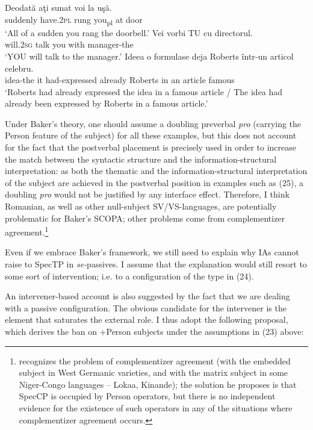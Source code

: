 \documentclass[output=paper]{langsci/langscibook}
\begin{document}
\ea%
    \label{ex:giurgea:25}
    \ea
    \gll Deodată   aţi           sunat   voi     la  uşă.  \\
          suddenly have.2\textsc{pl}  rung   you\textsubscript{pl}   at door\\
    \glt ‘All of a sudden you rang the doorbell.’
    \ex
    \gll Vei        vorbi TU  cu    directorul.         \\
         will.\textsc{2sg} talk    you with manager-the\\
    \glt ‘YOU will talk to the manager.’
    \ex
    \gll Ideea    o formulase         deja      Roberts într-un articol celebru. \\
         idea-the it had-expressed already Roberts  in  an article  famous    \\
    \glt ‘Roberts had already expressed the idea in a famous article / The idea had already been expressed by Roberts in a famous article.’
    \z
\z       

Under Baker’s theory, one should assume a doubling preverbal \textit{pro} (carrying the Person feature of the subject) for all these examples, but this does not account for the fact that the postverbal placement is precisely used in order to increase the match between the syntactic structure and the information-structural interpretation: as both the thematic and the information-structural interpretation of the subject are achieved in the postverbal position in examples such as (25), a doubling \textit{pro} would not be justified by any interface effect. Therefore, I think Romanian, as well as other null-subject SV/VS-languages, are potentially problematic for Baker’s SCOPA; other problems come from complementizer agreement.\footnote{\citet{Baker2008} recognizes the problem of complementizer agreement (with the embedded subject in West Germanic varieties, and with the matrix subject in some Niger-Congo languages – Lokaa, Kinande); the solution he proposes is that SpecCP is occupied by Person operators, but there is no independent evidence for the existence of such operators in any of the situations where complementizer agreement occurs.}

  Even if we embrace Baker’s framework, we still need to explain why IAs cannot raise to SpecTP in \textit{se-}passives. I assume that the explanation would still resort to some sort of intervention; i.e. to a configuration of the type in (24). 

  An intervener-based account is also suggested by the fact that we are dealing with a passive configuration. The obvious candidate for the intervener is the element that saturates the external role. I thus adopt the following proposal, which derives the ban on +Person subjects under the assumptions in (23) above:
\end{document}
